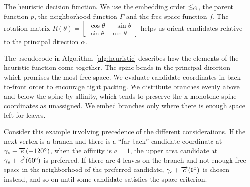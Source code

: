 \begin{algorithm}

\caption{The heuristic decision function. We use the embedding order $\leq_G$, the parent function $p$, the neighborhood function $\Gamma$ and the free space function $f$. The rotation matrix $R(\theta) = \begin{bmatrix}\cos \theta & -\sin \theta \\ \sin \theta & \cos \theta \end{bmatrix}$ helps us orient candidates relative to the principal direction $\alpha$.}
\label{alg:heuristic}
\end{algorithm}

The pseudocode in Algorithm~\ref{alg:heuristic} describes how the elements of the heuristic function come together. The spine bends in the principal direction, which promises the most free space. We evaluate candidate coordinates in back-to-front order to encourage tight packing. We distribute branches evenly above and below the spine by affinity, which tends to preserve the x-monotone spine coordinates as unassigned. We embed branches only where there is enough space left for leaves.

Consider this example involving precedence of the different considerations. If the next vertex is a branch and there is a ``far-back'' candidate coordinate at $\gamma_s + \overrightarrow e(-120^\circ)$, when the affinity is $a=1$, the upper area candidate at $\gamma_s + \overrightarrow e(60^\circ)$ is preferred. If there are 4 leaves on the branch and not enough free space in the neighborhood of the preferred candidate, $\gamma_s + \overrightarrow e(0^\circ)$ is chosen instead, and so on until some candidate satisfies the space criterion.

